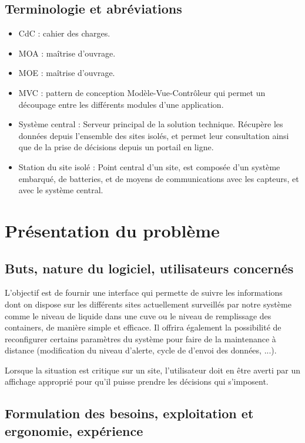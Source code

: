 \subsection{Terminologie et abréviations}

\begin{itemize}
	\item CdC : cahier des charges.
	\item MOA : maîtrise d'ouvrage.
	\item MOE : maîtrise d'ouvrage.
	\item MVC : pattern de conception Modèle-Vue-Contrôleur qui permet un découpage entre les différents modules d'une application.
	\item Système central : Serveur principal de la solution technique. Récupère les données depuis l'ensemble des sites isolés, et permet leur consultation ainsi que de la prise de décisions depuis un portail en ligne.
	\item Station du site isolé : Point central d'un site, est composée d'un système embarqué, de batteries, et de moyens de communications avec les capteurs, et avec le système central.
\end{itemize}

\section{Présentation du problème}

\subsection{Buts, nature du logiciel, utilisateurs concernés}

L'objectif est de fournir une interface qui permette de suivre les informations dont on dispose sur les différents sites actuellement surveillés par notre système comme le niveau de liquide dans une cuve ou le niveau de remplissage des containers, de manière simple et efficace. Il offrira également la possibilité de reconfigurer certains paramètres du système pour faire de la maintenance à distance (modification du niveau d'alerte, cycle de d'envoi des données, ...).

Lorsque la situation est critique sur un site, l'utilisateur doit en être averti par un affichage approprié pour qu'il puisse prendre les décisions qui s'imposent.

\subsection{Formulation des besoins, exploitation et ergonomie, expérience}

